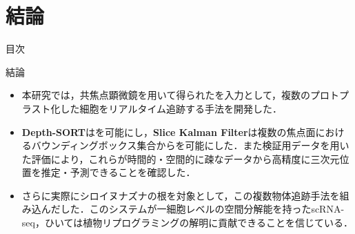 \section{結論}

\begin{frame}[noframenumbering]{目次}
    \tableofcontents[currentsection]
\end{frame}

\begin{frame}{結論}
    \begin{itemize}
        \item 本研究では，共焦点顕微鏡を用いて得られたを入力として，複数のプロトプラスト化した細胞をリアルタイム追跡する手法を開発した．
        \vs
        \item \textbf{Depth-SORT}はを可能にし，\textbf{Slice Kalman Filter}は複数の焦点面におけるバウンディングボックス集合からを可能にした．また検証用データを用いた評価により，これらが時間的・空間的に疎なデータから高精度に三次元位置を推定・予測できることを確認した．
        \vs
        \item さらに実際にシロイヌナズナの根を対象として，この複数物体追跡手法を組み込んだした．このシステムが一細胞レベルの空間分解能を持ったscRNA-seq，ひいては植物リプログラミングの解明に貢献できることを信じている．
    \end{itemize}
\end{frame}
